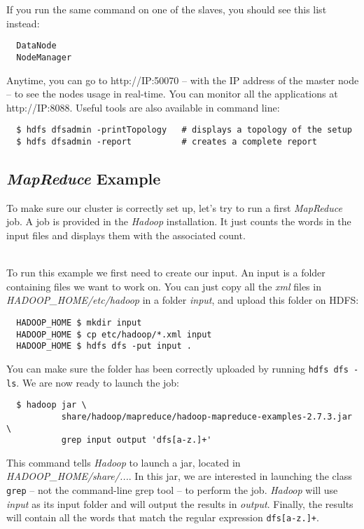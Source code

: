 \documentclass[a4paper, 12pt]{article}
\begin{document}
If you run the same command on one of the slaves, you should see this list instead:
\begin{verbatim}
  DataNode
  NodeManager
\end{verbatim}

Anytime, you can go to http://IP:50070 -- with the IP address of the master node -- to see the nodes usage in real-time. You can monitor all the applications at http://IP:8088. Useful tools are also available in command line:

\begin{verbatim}
  $ hdfs dfsadmin -printTopology   # displays a topology of the setup
  $ hdfs dfsadmin -report          # creates a complete report
\end{verbatim}

  \subsection{\textit{MapReduce} Example}

To make sure our cluster is correctly set up, let's try to run a first \textit{MapReduce} job. A job is provided in the \textit{Hadoop} installation. It just counts the words in the input files and displays them with the associated count. 

~\\
To run this example we first need to create our input. An input is a folder containing files we want to work on. You can just copy all the \textit{xml} files in \textit{HADOOP\_HOME/etc/hadoop} in a folder \textit{input}, and upload this folder on HDFS:

\begin{verbatim}
  HADOOP_HOME $ mkdir input
  HADOOP_HOME $ cp etc/hadoop/*.xml input
  HADOOP_HOME $ hdfs dfs -put input .
\end{verbatim}

You can make sure the folder has been correctly uploaded by running \texttt{hdfs dfs -ls}. We are now ready to launch the job:

\begin{verbatim}
  $ hadoop jar \
           share/hadoop/mapreduce/hadoop-mapreduce-examples-2.7.3.jar \
           grep input output 'dfs[a-z.]+'
\end{verbatim}

This command tells \textit{Hadoop} to launch a jar, located in \textit{HADOOP\_HOME/share/...}. In this jar, we are interested in launching the class \texttt{grep} -- not the command-line grep tool -- to perform the job. \textit{Hadoop} will use \textit{input} as its input folder and will output the results in \textit{output}. Finally, the results will contain all the words that match the regular expression \texttt{dfs[a-z.]+}.
\end{document}
